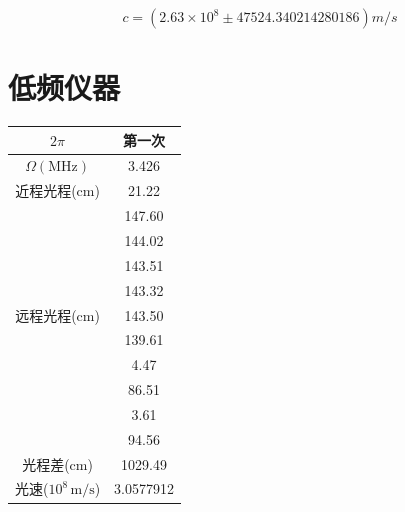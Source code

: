 \documentclass[10pt, a4paper]{article}
\begin{document}
\begin{equation}
    c = (2.63\times10^{8} \pm 47524.340214280186)m/s
\end{equation}

\section{低频仪器}
\begin{tabular}{|c|c|}
\hline
\(2\pi\) & 第一次 \\
\hline
\(\Omega(\text{MHz})\) & 3.426 \\
\hline
近程光程(cm) & 21.22 \\
\hline
\multirow{9}{*}{远程光程(cm)} & 147.60 \\
\hline
& 144.02 \\
\hline
& 143.51\\
\hline
& 143.32 \\
\hline
& 143.50 \\
\hline
& 139.61 \\
\hline
& 4.47 \\
\hline
& 86.51 \\
\hline
& 3.61 \\
\hline
& 94.56 \\
\hline
光程差(cm) & 1029.49 \\
\hline
光速(\(10^{8}\,\text{m/s}\)) & 3.0577912 \\
\hline
\end{tabular}
\end{document}
